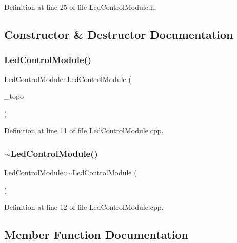 Definition at line 25 of file Led\+Control\+Module.\+h.



\subsection{Constructor \& Destructor Documentation}
\mbox{\label{class_led_control_module_a5a653e4a322f618a6937449fafe959bb}} 
\subsubsection{\texorpdfstring{LedControlModule()}{LedControlModule()}}
{\footnotesize\ttfamily Led\+Control\+Module\+::\+Led\+Control\+Module (\begin{DoxyParamCaption}\item[{Neo\+Topology$<$ \mbox{\hyperlink{_led_control_module_8h_a49b2323848e516b3241e758de64f0b3b}{My\+Panel\+Layout}} $>$}]{\+\_\+topo }\end{DoxyParamCaption})}



Definition at line 11 of file Led\+Control\+Module.\+cpp.

\mbox{\label{class_led_control_module_af6763089aa43e6be196651ec6708a4cd}} 
\subsubsection{\texorpdfstring{$\sim$LedControlModule()}{~LedControlModule()}}
{\footnotesize\ttfamily Led\+Control\+Module\+::$\sim$\+Led\+Control\+Module (\begin{DoxyParamCaption}{ }\end{DoxyParamCaption})}



Definition at line 12 of file Led\+Control\+Module.\+cpp.



\subsection{Member Function Documentation}
\mbox{\label{class_led_control_module_abd6255fc5d3a54b5befd131e56674313}} 

